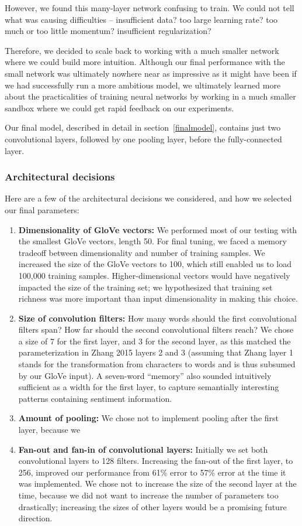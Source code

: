 \documentclass{article}
\begin{document}
However, we found this many-layer network confusing to train. We could not tell what was causing difficulties -- insufficient data? too large learning rate? too much or too little momentum? insufficient regularization?

Therefore, we decided to scale back to working with a much smaller network where we could build more intuition. Although our final performance with the small network was ultimately nowhere near as impressive as it might have been if we had successfully run a more ambitious model, we ultimately learned more about the practicalities of training neural networks by working in a much smaller sandbox where we could get rapid feedback on our experiments.

Our final model, described in detail in section~\ref{finalmodel}, contains just two convolutional layers, followed by one pooling layer, before the fully-connected layer.

\subsubsection*{Architectural decisions}

Here are a few of the architectural decisions we considered, and how we selected our final parameters:
\begin{enumerate}
\item{\textbf{Dimensionality of GloVe vectors:}} We performed most of our testing with the smallest GloVe vectors, length 50. For final tuning, we faced a memory tradeoff between dimensionality and number of training samples. We increased the size of the GloVe vectors to 100, which still enabled us to load 100,000 training samples. Higher-dimensional vectors would have negatively impacted the size of the training set; we hypothesized that training set richness was more important than input dimensionality in making this choice.
\item{\textbf{Size of convolution filters:}} How many words should the first convolutional filters span? How far should the second convolutional filters reach? We chose a size of 7 for the first layer, and 3 for the second layer, as this matched the parameterization in Zhang 2015 layers 2 and 3 (assuming that Zhang layer 1 stands for the transformation from characters to words and is thus subsumed by our GloVe input). A seven-word ``memory'' also sounded intuitively sufficient as a width for the first layer, to capture semantially interesting patterns containing sentiment information.
\item{\textbf{Amount of pooling:}} We chose not to implement pooling after the first layer, because we 
\item{\textbf{Fan-out and fan-in of convolutional layers:}} Initially we set both convolutional layers to 128 filters. Increasing the fan-out of the first layer, to 256, improved our performance from 61\% error to 57\% error at the time it was implemented. We chose not to increase the size of the second layer at the time, because we did not want to increase the number of parameters too drastically; increasing the sizes of other layers would be a promising future direction.
\end{enumerate}
\end{document}
